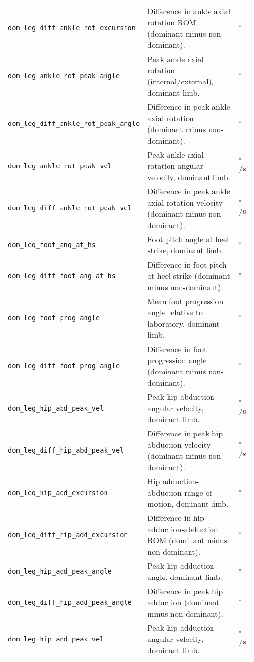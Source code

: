 \begin{longtable}{@{}l p{} l@{}}
    \texttt{dom\_leg\_diff\_ankle\_rot\_excursion} & Difference in ankle axial rotation ROM (dominant minus non-dominant). & $^\circ$ \\
    \texttt{dom\_leg\_ankle\_rot\_peak\_angle} & Peak ankle axial rotation (internal/external), dominant limb. & $^\circ$ \\
    \texttt{dom\_leg\_diff\_ankle\_rot\_peak\_angle} & Difference in peak ankle axial rotation (dominant minus non-dominant). & $^\circ$ \\
    \texttt{dom\_leg\_ankle\_rot\_peak\_vel} & Peak ankle axial rotation angular velocity, dominant limb. & $^\circ$/s \\
    \texttt{dom\_leg\_diff\_ankle\_rot\_peak\_vel} & Difference in peak ankle axial rotation velocity (dominant minus non-dominant). & $^\circ$/s \\
    \texttt{dom\_leg\_foot\_ang\_at\_hs} & Foot pitch angle at heel strike, dominant limb. & $^\circ$ \\
    \texttt{dom\_leg\_diff\_foot\_ang\_at\_hs} & Difference in foot pitch at heel strike (dominant minus non-dominant). & $^\circ$ \\
    \texttt{dom\_leg\_foot\_prog\_angle} & Mean foot progression angle relative to laboratory, dominant limb. & $^\circ$ \\
    \texttt{dom\_leg\_diff\_foot\_prog\_angle} & Difference in foot progression angle (dominant minus non-dominant). & $^\circ$ \\
    \texttt{dom\_leg\_hip\_abd\_peak\_vel} & Peak hip abduction angular velocity, dominant limb. & $^\circ$/s \\
    \texttt{dom\_leg\_diff\_hip\_abd\_peak\_vel} & Difference in peak hip abduction velocity (dominant minus non-dominant). & $^\circ$/s \\
    \texttt{dom\_leg\_hip\_add\_excursion} & Hip adduction-abduction range of motion, dominant limb. & $^\circ$ \\
    \texttt{dom\_leg\_diff\_hip\_add\_excursion} & Difference in hip adduction-abduction ROM (dominant minus non-dominant). & $^\circ$ \\
    \texttt{dom\_leg\_hip\_add\_peak\_angle} & Peak hip adduction angle, dominant limb. & $^\circ$ \\
    \texttt{dom\_leg\_diff\_hip\_add\_peak\_angle} & Difference in peak hip adduction (dominant minus non-dominant). & $^\circ$ \\
    \texttt{dom\_leg\_hip\_add\_peak\_vel} & Peak hip adduction angular velocity, dominant limb. & $^\circ$/s \\

\end{longtable}
